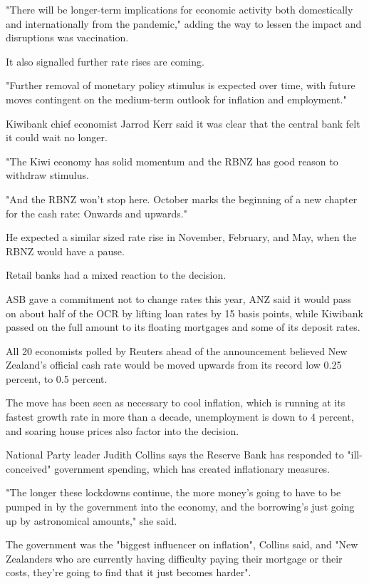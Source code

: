 \documentclass[a4paper,12pt]{article}
\begin{document}
"There will be longer-term implications for economic activity both domestically and internationally from the pandemic," adding the way to lessen the impact and disruptions was vaccination.

It also signalled further rate rises are coming.

"Further removal of monetary policy stimulus is expected over time, with future moves contingent on the medium-term outlook for inflation and employment."

Kiwibank chief economist Jarrod Kerr said it was clear that the central bank felt it could wait no longer.

"The Kiwi economy has solid momentum and the RBNZ has good reason to withdraw stimulus.

"And the RBNZ won't stop here. October marks the beginning of a new chapter for the cash rate: Onwards and upwards."

He expected a similar sized rate rise in November, February, and May, when the RBNZ would have a pause.

Retail banks had a mixed reaction to the decision.

ASB gave a commitment not to change rates this year, ANZ said it would pass on about half of the OCR by lifting loan rates by 15 basis points, while Kiwibank passed on the full amount to its floating mortgages and some of its deposit rates.

All 20 economists polled by Reuters ahead of the announcement believed New Zealand's official cash rate would be moved upwards from its record low 0.25 percent, to 0.5 percent.

The move has been seen as necessary to cool inflation, which is running at its fastest growth rate in more than a decade, unemployment is down to 4 percent, and soaring house prices also factor into the decision.

National Party leader Judith Collins says the Reserve Bank has responded to "ill-conceived" government spending, which has created inflationary measures.

"The longer these lockdowns continue, the more money's going to have to be pumped in by the government into the economy, and the borrowing's just going up by astronomical amounts," she said.

The government was the "biggest influencer on inflation", Collins said, and "New Zealanders who are currently having difficulty paying their mortgage or their costs, they're going to find that it just becomes harder".
\end{document}
